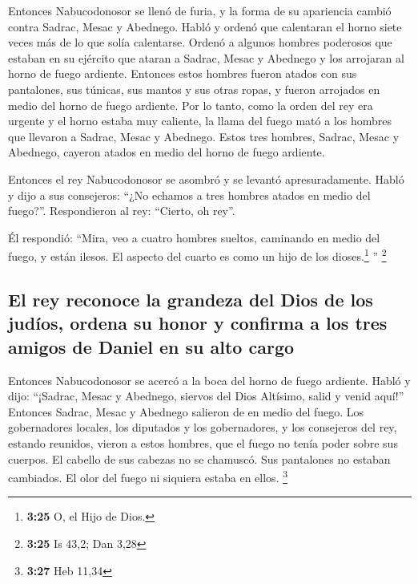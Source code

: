 \begin{paracol}{2}
 Entonces Nabucodonosor se llenó de furia, y la forma de
su apariencia cambió contra Sadrac, Mesac y Abednego. Habló y ordenó que
calentaran el horno siete veces más de lo que solía calentarse.
 Ordenó a algunos hombres poderosos que estaban en su
ejército que ataran a Sadrac, Mesac y Abednego y los arrojaran al horno
de fuego ardiente.  Entonces estos hombres fueron atados
con sus pantalones, sus túnicas, sus mantos y sus otras ropas, y fueron
arrojados en medio del horno de fuego ardiente.  Por lo
tanto, como la orden del rey era urgente y el horno estaba muy caliente,
la llama del fuego mató a los hombres que llevaron a Sadrac, Mesac y
Abednego.  Estos tres hombres, Sadrac, Mesac y Abednego,
cayeron atados en medio del horno de fuego ardiente.

 Entonces el rey Nabucodonosor se asombró y se levantó
apresuradamente. Habló y dijo a sus consejeros: ``¿No echamos a tres
hombres atados en medio del fuego?''. Respondieron al rey: ``Cierto, oh
rey''.

 Él respondió: ``Mira, veo a cuatro hombres sueltos,
caminando en medio del fuego, y están ilesos. El aspecto del cuarto es
como un hijo de los dioses.\footnote{\textbf{3:25} O, el Hijo de Dios.}
'' \footnote{\textbf{3:25} Is 43,2; Dan 3,28}

\hypertarget{el-rey-reconoce-la-grandeza-del-dios-de-los-juduxedos-ordena-su-honor-y-confirma-a-los-tres-amigos-de-daniel-en-su-alto-cargo}{%
\subsection{El rey reconoce la grandeza del Dios de los judíos, ordena
su honor y confirma a los tres amigos de Daniel en su alto
cargo}\label{el-rey-reconoce-la-grandeza-del-dios-de-los-juduxedos-ordena-su-honor-y-confirma-a-los-tres-amigos-de-daniel-en-su-alto-cargo}}

 Entonces Nabucodonosor se acercó a la boca del horno de
fuego ardiente. Habló y dijo: ``¡Sadrac, Mesac y Abednego, siervos del
Dios Altísimo, salid y venid aquí!'' Entonces Sadrac, Mesac y Abednego
salieron de en medio del fuego.  Los gobernadores
locales, los diputados y los gobernadores, y los consejeros del rey,
estando reunidos, vieron a estos hombres, que el fuego no tenía poder
sobre sus cuerpos. El cabello de sus cabezas no se chamuscó. Sus
pantalones no estaban cambiados. El olor del fuego ni siquiera estaba en
ellos. \footnote{\textbf{3:27} Heb 11,34}


\end{paracol}
